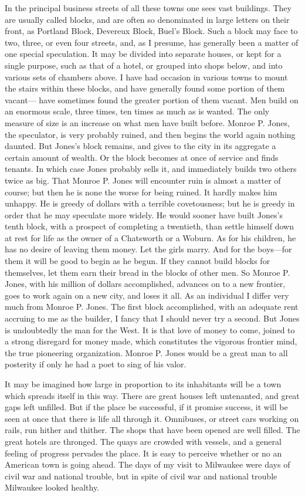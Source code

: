 In the principal business streets of all these towns one sees vast
buildings.  They are usually called blocks, and are often so
denominated in large letters on their front, as Portland Block,
Devereux Block, Buel's Block.  Such a block may face to two, three,
or even four streets, and, as I presume, has generally been a
matter of one special speculation.  It may be divided into separate
houses, or kept for a single purpose, such as that of a hotel, or
grouped into shops below, and into various sets of chambers above.
I have had occasion in various towns to mount the stairs within
these blocks, and have generally found some portion of them vacant---%
have sometimes found the greater portion of them vacant.  Men
build on an enormous scale, three times, ten times as much as is
wanted.  The only measure of size is an increase on what men have
built before.  Monroe P. Jones, the speculator, is very probably
ruined, and then begins the world again nothing daunted.  But
Jones's block remains, and gives to the city in its aggregate a
certain amount of wealth.  Or the block becomes at once of service
and finds tenants.  In which case Jones probably sells it, and
immediately builds two others twice as big.  That Monroe P. Jones
will encounter ruin is almost a matter of course; but then he is
none the worse for being ruined.  It hardly makes him unhappy.  He
is greedy of dollars with a terrible covetousness; but he is greedy
in order that he may speculate more widely.  He would sooner have
built Jones's tenth block, with a prospect of completing a
twentieth, than settle himself down at rest for life as the owner
of a Chatsworth or a Woburn.  As for his children, he has no desire
of leaving them money.  Let the girls marry.  And for the boys---for
them it will be good to begin as he begun.  If they cannot build
blocks for themselves, let them earn their bread in the blocks of
other men.  So Monroe P. Jones, with his million of dollars
accomplished, advances on to a new frontier, goes to work again on
a new city, and loses it all.  As an individual I differ very much
from Monroe P. Jones.  The first block accomplished, with an
adequate rent accruing to me as the builder, I fancy that I should
never try a second.  But Jones is undoubtedly the man for the West.
It is that love of money to come, joined to a strong disregard for
money made, which constitutes the vigorous frontier mind, the true
pioneering organization.  Monroe P. Jones would be a great man to
all posterity if only he had a poet to sing of his valor.

It may be imagined how large in proportion to its inhabitants will
be a town which spreads itself in this way.  There are great houses
left untenanted, and great gaps left unfilled.  But if the place be
successful, if it promise success, it will be seen at once that
there is life all through it.  Omnibuses, or street cars working on
rails, run hither and thither.  The shops that have been opened are
well filled.  The great hotels are thronged.  The quays are crowded
with vessels, and a general feeling of progress pervades the place.
It is easy to perceive whether or no an American town is going
ahead.  The days of my visit to Milwaukee were days of civil war
and national trouble, but in spite of civil war and national
trouble Milwaukee looked healthy.

